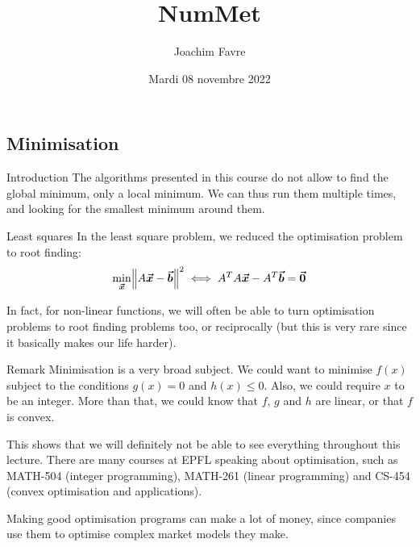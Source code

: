 \documentclass[a4paper]{article}
\title{NumMet}
\author{Joachim Favre}
\date{Mardi 08 novembre 2022}
\begin{document}
\maketitle


\subsection{Minimisation}
\begin{parag}{Introduction}
    The algorithms presented in this course do not allow to find the global minimum, only a local minimum. We can thus run them multiple times, and looking for the smallest minimum around them.

    \begin{subparag}{Least squares}
        In the least square problem, we reduced the optimisation problem to root finding: 
        \[\min_{\bvec{x}} \left\|A \bvec{x} - \bvec{b}\right\|^2 \iff A^T A \bvec{x} - A^T \bvec{b} = \bvec{0}\]

        In fact, for non-linear functions, we will often be able to turn optimisation problems to root finding problems too, or reciprocally (but this is very rare since it basically makes our life harder).
    \end{subparag}

    \begin{subparag}{Remark}
        Minimisation is a very broad subject. We could want to minimise $f\left(x\right)$ subject to the conditions $g\left(x\right) = 0$ and $h\left(x\right) \leq 0$. Also, we could require $x$ to be an integer. More than that, we could know that $f$, $g$ and $h$ are linear, or that $f$ is convex.

        This shows that we will definitely not be able to see everything throughout this lecture. There are many courses at EPFL speaking about optimisation, such as MATH-504 (integer programming), MATH-261 (linear programming) and CS-454 (convex optimisation and applications).

        Making good optimisation programs can make a lot of money, since companies use them to optimise complex market models they make.
    \end{subparag}
\end{parag}
\end{document}
